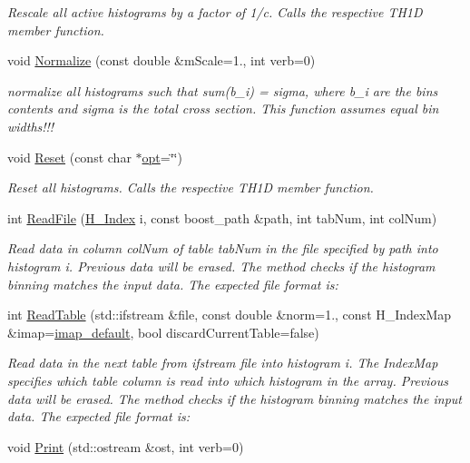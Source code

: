 \begin{DoxyCompactItemize}
\begin{DoxyCompactList}\small\item\em Rescale all active histograms by a factor of 1/c. Calls the respective T\+H1\+D member function. \end{DoxyCompactList}\item 
void \hyperlink{classHistArray_a2c7edebf7ddf7d5dcc2cbb30f46601e5}{Normalize} (const double \&m\+Scale=1., int verb=0)
\begin{DoxyCompactList}\small\item\em normalize all histograms such that sum(b\+\_\+i) = sigma, where b\+\_\+i are the bins contents and sigma is the total cross section. This function assumes equal bin widths!!! \end{DoxyCompactList}\item 
void \hyperlink{classHistArray_a75049ae9fb04661cdd2f3c3e67550568}{Reset} (const char $\ast$\hyperlink{structopt}{opt}=\char`\"{}\char`\"{})
\begin{DoxyCompactList}\small\item\em Reset all histograms. Calls the respective T\+H1\+D member function. \end{DoxyCompactList}\item 
int \hyperlink{classHistArray_a86df487949773c027114237875ba7c94}{Read\+File} (\hyperlink{HistArray_8h_abdf25c9f0ab78c4243f63cb2bacf26d9}{H\+\_\+\+Index} i, const boost\+\_\+path \&path, int tab\+Num, int col\+Num)
\begin{DoxyCompactList}\small\item\em Read data in column \textquotesingle{}col\+Num\textquotesingle{} of table \textquotesingle{}tab\+Num\textquotesingle{} in the file specified by \textquotesingle{}path\textquotesingle{} into histogram \textquotesingle{}i\textquotesingle{}. Previous data will be erased. The method checks if the histogram binning matches the input data. The expected file format is\+: \end{DoxyCompactList}\item 
int \hyperlink{classHistArray_ad41461653c6d0a87d8b36db233a71a0f}{Read\+Table} (std\+::ifstream \&file, const double \&norm=1., const H\+\_\+\+Index\+Map \&imap=\hyperlink{HistArray_8h_a8f6e68438441b2967eb8e97c8b4c2380}{imap\+\_\+default}, bool discard\+Current\+Table=false)
\begin{DoxyCompactList}\small\item\em Read data in the next table from ifstream \textquotesingle{}file\textquotesingle{} into histogram \textquotesingle{}i\textquotesingle{}. The Index\+Map specifies which table column is read into which histogram in the array. Previous data will be erased. The method checks if the histogram binning matches the input data. The expected file format is\+: \end{DoxyCompactList}\item 
\hypertarget{classHistArray_a6c4b65bc9d26ecb8da0519854bfde4e6}{}void \hyperlink{classHistArray_a6c4b65bc9d26ecb8da0519854bfde4e6}{Print} (std\+::ostream \&ost, int verb=0)\label{classHistArray_a6c4b65bc9d26ecb8da0519854bfde4e6}


\end{DoxyCompactItemize}

